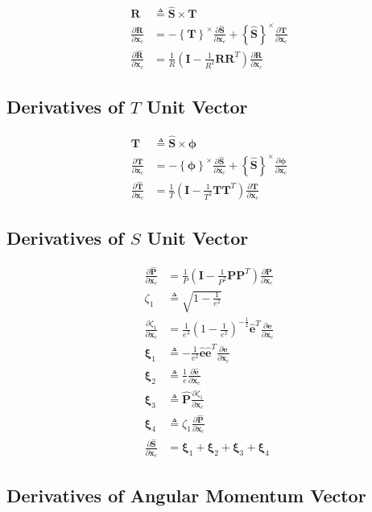 \documentclass[]{article}
\newcommand{\vb}[1]{\bm{#1}} %
\newcommand{\vbh}[1]{\hat{\bm{#1}}} %
\newcommand{\pd}[2]{\frac{\partial #1}{\partial #2}} %
\newcommand{\crossmat}[1]{\left\{ {#1} \right\}^{\times}} %
\newcommand{\xc}[0]{\vb{x}_c}
\begin{document}
\begin{align}
	\vb{R} &\triangleq \vbh{S} \times \vb{T} \\
	\pd{\vb{R}}{\xc} &= -\crossmat{\vb{T}} \pd{\vbh{S}}{\xc} + \crossmat{\vbh{S}} \pd{\vb{T}}{\xc} \\
	\pd{\vbh{R}}{\xc} &= \frac{1}{R} \left( \vb{I} - \frac{1}{R^2} \vb{R} \vb{R}^T \right) \pd{\vb{R}}{\xc}
\end{align}

\subsection{Derivatives of $T$ Unit Vector}

\begin{align}
\vb{T} &\triangleq \vbh{S} \times \vb{\phi} \\
\pd{\vb{T}}{\xc} &= -\crossmat{\vb{\phi}} \pd{\vbh{S}}{\xc} + \crossmat{\vbh{S}} \pd{\vb{\phi}}{\xc} \\
\pd{\vbh{T}}{\xc} &= \frac{1}{T} \left( \vb{I} - \frac{1}{T^2} \vb{T} \vb{T}^T \right) \pd{\vb{T}}{\xc}
\end{align}


\subsection{Derivatives of $S$ Unit Vector}
\label{sec:cartesian2bplanejac_sunit}

\begin{align}
	\pd{\vbh{P}}{\xc} &= \frac{1}{P} \left( \vb{I} - \frac{1}{P^2} \vb{P} \vb{P}^T \right) \pd{\vb{P}}{\xc} \\
	\zeta_1 &\triangleq \sqrt{1 - \frac{1}{e^2}} \\
	\pd{\zeta_1}{\xc} &= \frac{1}{e^3} \left( 1 - \frac{1}{e^2} \right)^{-\frac{1}{2}} \vbh{e}^T \pd{\vb{e}}{\xc} \\
	\vb{\xi}_1 &\triangleq - \frac{1}{e^2} \vbh{e} \vbh{e}^T \pd{\vb{e}}{\xc} \\
	\vb{\xi}_2 &\triangleq \frac{1}{e} \pd{\vbh{e}}{\xc} \\
	\vb{\xi}_3 &\triangleq \vbh{P} \pd{\zeta_1}{\xc} \\
	\vb{\xi}_4 &\triangleq \zeta_1 \pd{\vbh{P}}{\xc} \\
	\label{eq:d_sunit_d_xc_in}
	\pd{\vbh{S}}{\xc} &= \vb{\xi}_1 + \vb{\xi}_2 + \vb{\xi}_3 + \vb{\xi}_4
\end{align}

\subsection{Derivatives of Angular Momentum Vector}
\end{document}
